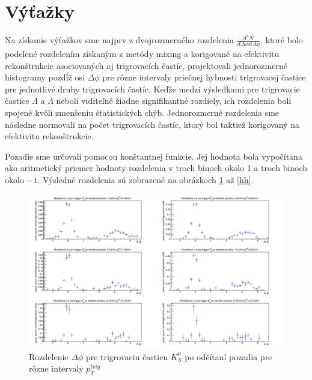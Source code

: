 \documentclass[thesismargins, thesislinespacing]{rnthesis}
\begin{document}
\section{Výťažky}

Na získanie výťažkov sme najprv z dvojrozmerného rozdelenia $\frac{d^2N}{d\Delta \phi d\Delta \eta}$, ktoré bolo podelené rozdelením získaným z metódy mixing a korigované na efektivitu rekonštrukcie asociovaných aj trigrovacích častíc, projektovali jednorozmerné histogra\-my pozdĺž osi $\Delta\phi$ pre rôzne intervaly priečnej hybnosti trigrovacej častice pre jednotlivé druhy trigrovacích častíc. Keďže medzi  výsledkami pre trigrovacie častice $\Lambda$ a $\bar{\Lambda}$ neboli viditeľné žiadne signifikantné rozdiely, ich rozdelenia boli spojené kvôli zmenšeniu štatistických chýb. Jednorozmerné rozdelenia sme následne normovali na počet trigrovacích častíc, ktorý bol taktiež korigovaný na efektivitu rekonštrukcie. 

Pozadie sme určovali pomocou konštantnej funkcie. Jej hodnota bola vypočítana ako aritmetický priemer hodnoty rozdelenia v troch binoch okolo 1 a troch binoch okolo $-1$. Výsledné rozdelenia sú zobrazené na obrázkoch \ref{K0} až \ref{hh}. 

\begin{figure}[hbtp!]
	\centering
	\includegraphics[width=\textwidth]{./Obrazky_praca/DeltaPhiKH.png}
	\caption{Rozdelenie $\Delta \phi$ pre trigrovaciu časticu $K^0_S$ po odčítaní pozadia pre rôzne intervaly $p_T^{trig}$}
	\label{K0}
\end{figure}
\end{document}
